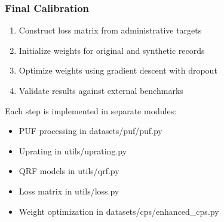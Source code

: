 \subsubsection{Final Calibration}

\begin{enumerate}
    \item Construct loss matrix from administrative targets
    \item Initialize weights for original and synthetic records
    \item Optimize weights using gradient descent with dropout
    \item Validate results against external benchmarks
\end{enumerate}

Each step is implemented in separate modules:
\begin{itemize}
    \item PUF processing in datasets/puf/puf.py
    \item Uprating in utils/uprating.py
    \item QRF models in utils/qrf.py
    \item Loss matrix in utils/loss.py
    \item Weight optimization in datasets/cps/enhanced\_cps.py
\end{itemize}